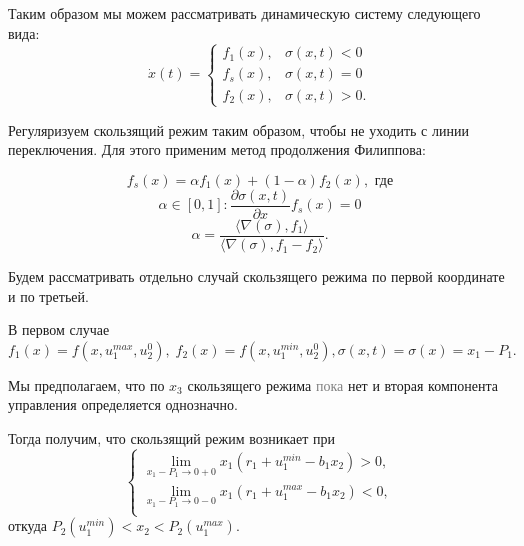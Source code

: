 \documentclass[11pt]{article}
\newcommand\dd[2]{\frac{\partial#1}{\partial#2}}
\begin{document}
Таким образом мы можем рассматривать динамическую систему следующего вида:
$$\dot x(t) = \begin{cases} f_1(x), & \sigma(x,t) < 0 \\ f_s(x), & \sigma(x,t) = 0 \\ f_2(x), & \sigma(x,t) > 0.\end{cases}$$

Регуляризуем скользящий режим таким образом, чтобы не уходить с линии переключения. Для этого применим метод продолжения Филиппова:

$$f_s(x) = \alpha f_1(x) + (1 - \alpha) f_2(x), \text{  где}$$
$$\alpha \in [0, 1] : \dd{\sigma(x,t)}{x} f_s(x) = 0$$
$$\alpha = \frac{\langle \nabla(\sigma), f_1\rangle}{\langle \nabla(\sigma), f_1 - f_2 \rangle}.$$

Будем рассматривать отдельно случай скользящего режима по первой координате и по третьей.

В первом случае 
$f_1(x) = f(x,u_1^{max}, u_2^0), \; f_2(x) = f(x,u_1^{min}, u_2^0), \sigma(x,t) = \sigma(x) = x_1 - P_1.$

Мы предполагаем, что по $x_3$ скользящего режима \textcolor{gray}{пока} нет и вторая компонента управления определяется однозначно.

Тогда получим, что скользящий режим возникает при 
$$
\left\{
\begin{aligned}
	\lim_{x_1 - P_1 \to 0 + 0} x_1(r_1 + u_1^{min} - b_1x_2) > 0, \\
	\lim_{x_1 - P_1 \to 0 - 0} x_1(r_1 + u_1^{max} - b_1x_2) < 0, \\
\end{aligned}
\right.
$$
откуда $P_2(u_1^{min}) < x_2 < P_2(u_1^{max}).$
\end{document}
